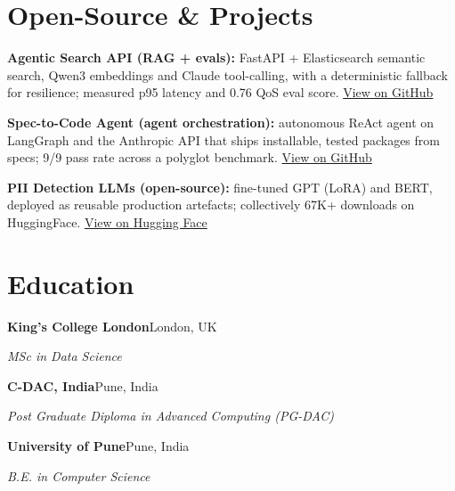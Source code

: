 \documentclass[10pt,a4paper]{article}
\begin{document}
\section{Open-Source \& Projects}
\begin{tight}
  \item \textbf{Agentic Search API (RAG + evals):} FastAPI + Elasticsearch semantic search, Qwen3 embeddings and Claude tool-calling, with a deterministic fallback for resilience; measured p95 latency and 0.76 QoS eval score. \href{https://github.com/abhijeetscode/search-agent}{View on GitHub}
  \item \textbf{Spec-to-Code Agent (agent orchestration):} autonomous ReAct agent on LangGraph and the Anthropic API that ships installable, tested packages from specs; 9/9 pass rate across a polyglot benchmark. \href{https://github.com/abhijeetscode/Spec-to-Code-Agent}{View on GitHub}
  \item \textbf{PII Detection LLMs (open-source):} fine-tuned GPT (LoRA) and BERT, deployed as reusable production artefacts; collectively 67K+ downloads on HuggingFace. \href{https://huggingface.co/ab-ai/pii_model}{View on Hugging Face}
\end{tight}

\section{Education}
{\color{company}\bfseries King's College London}\hfill {\color{muted}London, UK}\par
{\itshape MSc in Data Science}\par\vspace{2pt}
{\color{company}\bfseries C-DAC, India}\hfill {\color{muted}Pune, India}\par
{\itshape Post Graduate Diploma in Advanced Computing (PG-DAC)}\par\vspace{2pt}
{\color{company}\bfseries University of Pune}\hfill {\color{muted}Pune, India}\par
{\itshape B.E. in Computer Science}\par
\end{document}
